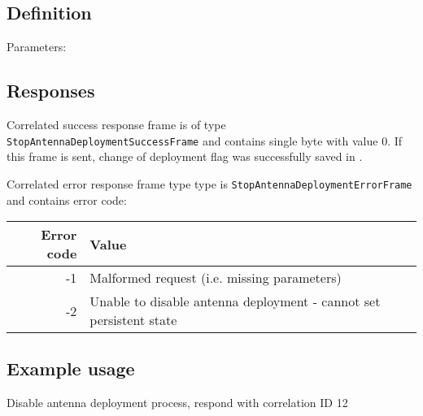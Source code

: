 \subsection{Definition}

Parameters:

\begin{tcarglist}
\end{tcarglist}

\subsection{Responses}


Correlated success response frame is of type \texttt{StopAntennaDeploymentSuccessFrame} and contains single byte with value 0. If this frame is sent, change of deployment flag was successfully saved in .


Correlated error response frame type type is \texttt{StopAntennaDeploymentErrorFrame} and contains error code:

\begin{tabular}{r | l}
    Error code & Value \\
    \hline
    -1 & Malformed request (i.e. missing parameters) \\
    -2 & Unable to disable antenna deployment - cannot set persistent state
\end{tabular}

\subsection{Example usage}
Disable antenna deployment process, respond with correlation ID 12
